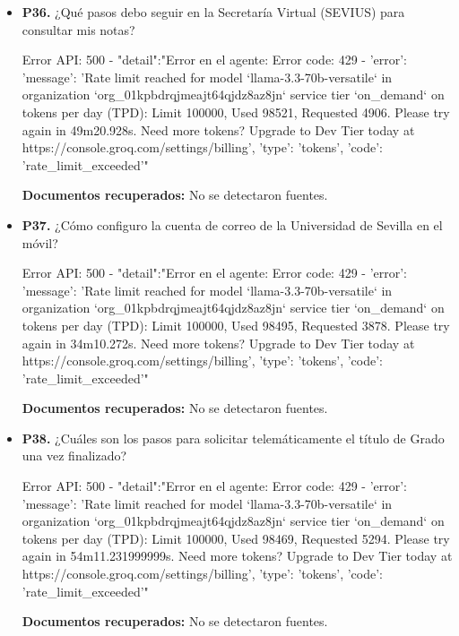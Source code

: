 \documentclass{article}
\begin{document}
\begin{itemize}
  \item \textbf{P36.} ¿Qué pasos debo seguir en la Secretaría Virtual (SEVIUS) para consultar mis notas? \\
    \begin{respuesta_agente}
      Error API: 500 - {"detail":"Error en el agente: Error code: 429 - {'error': {'message': 'Rate limit reached for model `llama-3.3-70b-versatile` in organization `org_01kpbdrqjmeajt64qjdz8az8jn` service tier `on_demand` on tokens per day (TPD): Limit 100000, Used 98521, Requested 4906. Please try again in 49m20.928s. Need more tokens? Upgrade to Dev Tier today at https://console.groq.com/settings/billing', 'type': 'tokens', 'code': 'rate_limit_exceeded'}}"}
    \end{respuesta_agente}
    \vspace{0.2cm}
    \noindent\textbf{Documentos recuperados:} No se detectaron fuentes.

  \item \textbf{P37.} ¿Cómo configuro la cuenta de correo de la Universidad de Sevilla en el móvil? \\
    \begin{respuesta_agente}
      Error API: 500 - {"detail":"Error en el agente: Error code: 429 - {'error': {'message': 'Rate limit reached for model `llama-3.3-70b-versatile` in organization `org_01kpbdrqjmeajt64qjdz8az8jn` service tier `on_demand` on tokens per day (TPD): Limit 100000, Used 98495, Requested 3878. Please try again in 34m10.272s. Need more tokens? Upgrade to Dev Tier today at https://console.groq.com/settings/billing', 'type': 'tokens', 'code': 'rate_limit_exceeded'}}"}
    \end{respuesta_agente}
    \vspace{0.2cm}
    \noindent\textbf{Documentos recuperados:} No se detectaron fuentes.

  \item \textbf{P38.} ¿Cuáles son los pasos para solicitar telemáticamente el título de Grado una vez finalizado? \\
    \begin{respuesta_agente}
      Error API: 500 - {"detail":"Error en el agente: Error code: 429 - {'error': {'message': 'Rate limit reached for model `llama-3.3-70b-versatile` in organization `org_01kpbdrqjmeajt64qjdz8az8jn` service tier `on_demand` on tokens per day (TPD): Limit 100000, Used 98469, Requested 5294. Please try again in 54m11.231999999s. Need more tokens? Upgrade to Dev Tier today at https://console.groq.com/settings/billing', 'type': 'tokens', 'code': 'rate_limit_exceeded'}}"}
    \end{respuesta_agente}
    \vspace{0.2cm}
    \noindent\textbf{Documentos recuperados:} No se detectaron fuentes.


\end{itemize}
\end{document}

